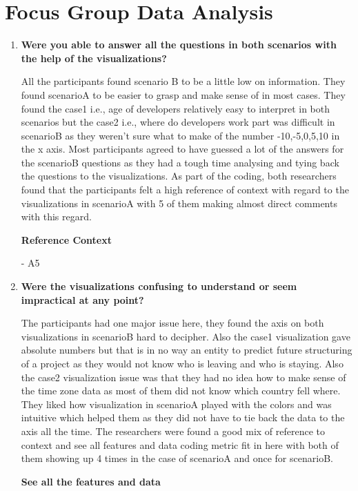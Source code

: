 \documentclass[seploa]{beavtex}
\begin{document}
\section{Focus Group Data Analysis}
\begin{enumerate}
\item \textbf{Were you able to answer all the questions in both scenarios with the help of the visualizations?}

All the participants found scenario B to be a little low on information. They found scenarioA to be easier to grasp and make sense of in most cases. They found the case1 i.e., age of developers relatively easy to interpret in both scenarios but the case2 i.e., where do developers work part was difficult in scenarioB as they weren't sure what to make of the number -10,-5,0,5,10 in the x axis. Most participants agreed to have guessed a lot of the answers for the scenarioB questions as they had a tough time analysing and tying back the questions to the visualizations.
As part of the coding, both researchers found that the participants felt a high reference of context with regard to the visualizations in scenarioA with 5 of them making almost direct comments with this regard.

\textbf{Reference Context}

{\em {}}- A5

\item \textbf{Were the visualizations confusing to understand or seem impractical at any point?}

The participants had one major issue here, they found the axis on both visualizations in scenarioB hard to decipher. Also the case1 visualization gave absolute numbers but that is in no way an entity to predict future structuring of a project as they would not know who is leaving and who is staying. Also the case2 visualization issue was that they had no idea how to make sense of the time zone data as most of them did not know which country fell where. They liked how visualization in scenarioA played with the colors and was intuitive which helped them as they did not have to tie back the data to the axis all the time. The researchers were found a good mix of reference to context and see all features and data coding metric fit in here with both of them showing up 4 times in the case of scenarioA and once for scenarioB.

\textbf{See all the features and data}


\end{enumerate}
\end{document}
